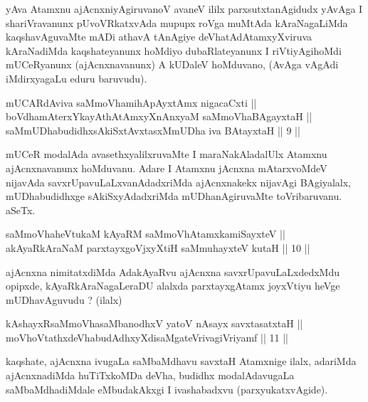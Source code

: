 \begin{artha}
yAva Atamxnu ajAcnxniyAgiruvanoV avaneV ililx parxsutxtanAgidudx yAvAga
I shariVravanunx pUvoVRkatxvAda mupupx roVga muMtAda kAraNagaLiMda
kaqshavAguvaMte mADi athavA tAnAgiye deVhatAdAtamxyXviruva kAraNadiMda
kaqshateyanunx hoMdiyo dubaRlateyanunx I riVtiyAgihoMdi mUCeRyanunx
(ajAcnxnavanunx) A kUDaleV hoMduvano,  (AvAga vAgAdi iMdirxyagaLu eduru
baruvudu).
\end{artha}

\begin{shl}
mUCARdAviva saMmoVhamihApAyxtAmx nigacaCxti || \\
boVdhamAterxYkayAthAtAmxyXnAnxyaM saMmoVhaBAgayxtaH ||  \\
saMmUDhabudidhxsAkiSxtAvxtasxMmUDha iva BAtayxtaH \hfill || 9 ||
  
\end{shl}

\begin{artha}
mUCeR modalAda avasethxyalilxruvaMte I maraNakAladalUlx Atamxnu
ajAcnxnavanunx hoMduvanu. Adare I Atamxnu jAcnxna mAtarxvoMdeV
nijavAda savxrUpavuLaLxvanAdadxriMda ajAcnxnakekx nijavAgi BAgiyalalx,
mUDhabudidhxge sAkiSxyAdadxriMda mUDhanAgiruvaMte toVribaruvanu. aSeTx.
\end{artha}


\begin{shl}
saMmoVhaheVtukaM kAyaRM saMmoVhAtamxkamiSayxteV ||  \\
akAyaRkAraNaM parxtayxgoVjxyXtiH saMmuhayxteV kutaH \hfill || 10 ||
  
\end{shl}

\begin{artha}
ajAcnxna nimitatxdiMda AdakAyaRvu ajAcnxna savxrUpavuLaLxdedxMdu
opipxde, kAyaRkAraNagaLeraDU alalxda parxtayxgAtamx joyxVtiyu heVge
mUDhavAguvudu ? (ilalx)
\end{artha}

\begin{shl}
kAshayxRsaMmoVhasaMbanodhxV yatoV nAsayx savxtasatxtaH || \\
moVhoVtathxdeVhabudAdhxyXdisaMgateVrivagiVriyamf \hfill || 11 ||
 
\end{shl}

\begin{artha}
kaqshate, ajAcnxna ivugaLa saMbaMdhavu savxtaH Atamxnige ilalx,
adariMda ajAcnxnadiMda huTiTxkoMDa deVha, budidhx modalAdavugaLa
saMbaMdhadiMdale eMbudakAkxgi I ivashabadxvu (parxyukatxvAgide).
\end{artha}

